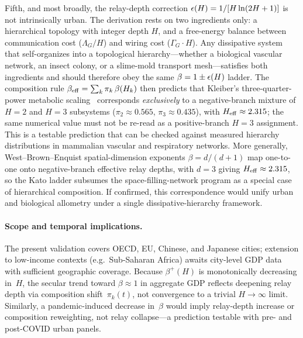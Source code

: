 Fifth, and most broadly, the relay-depth correction
$\epsilon\!\left(H\right)=1/[H\ln(2H+1)]$ is not intrinsically urban.
The derivation rests on two ingredients only: a hierarchical topology
with integer depth $H$, and a free-energy balance between
communication cost ($\Lambda_G/H$) and wiring cost ($\Gamma_G\cdot H$).
Any dissipative system that self-organizes into a
topological hierarchy---whether a biological vascular network, an
insect colony, or a slime-mold transport mesh---satisfies both
ingredients and should therefore obey the same
$\beta=1\pm\epsilon\!\left(H\right)$ ladder.
The composition rule $\beta_{\mathrm{eff}}=\sum_k\pi_k\,\beta(H_k)$
then predicts that Kleiber's three-quarter-power metabolic
scaling~\cite{Kleiber1932,West1997} corresponds \emph{exclusively} to a
negative-branch mixture of $H=2$ and $H=3$ subsystems
($\pi_2\approx 0.565$, $\pi_3\approx 0.435$), with
$H_{\mathrm{eff}}\approx 2.315$; the same numerical value must not be re-read as a
positive-branch $H=3$ assignment. This is a testable prediction that can be
checked against measured hierarchy distributions in mammalian vascular and
respiratory networks.
More generally, West--Brown--Enquist spatial-dimension exponents
$\beta=d/(d+1)$ map one-to-one onto negative-branch effective relay depths,
with $d=3$ giving $H_{\mathrm{eff}}\approx 2.315$, so the Kato ladder subsumes
the space-filling-network program as a special case of hierarchical
composition.
If confirmed, this correspondence would unify urban and biological
allometry under a single dissipative-hierarchy framework.

\paragraph{Scope and temporal implications.}
The present validation covers OECD, EU, Chinese, and Japanese cities;
extension to low-income contexts (e.g.\ Sub-Saharan Africa) awaits
city-level GDP data with sufficient geographic coverage.
Because $\beta^{+}(H)$ is monotonically decreasing in~$H$, the
secular trend toward $\beta\!\approx\!1$ in aggregate GDP reflects
deepening relay depth via composition shift~$\pi_k(t)$, not
convergence to a trivial $H\!\to\!\infty$ limit.
Similarly, a pandemic-induced decrease in~$\beta$ would imply
relay-depth increase or composition reweighting, not relay collapse---a
prediction testable with pre- and post-COVID urban panels.

